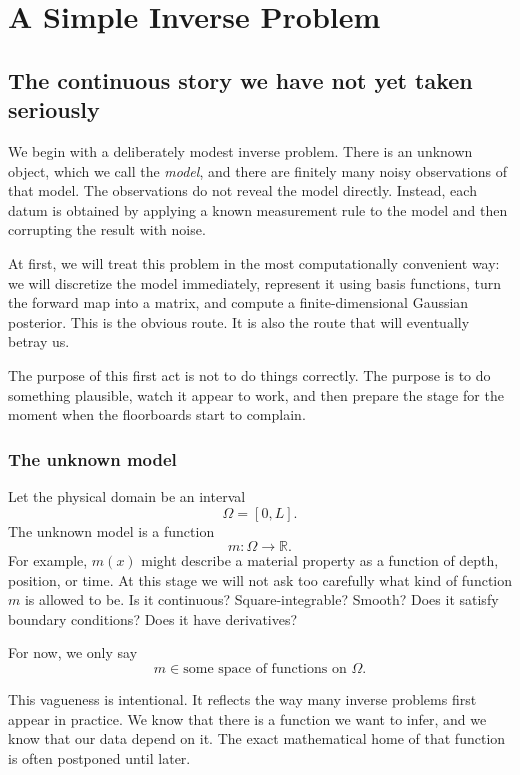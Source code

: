\documentclass[11pt,a4paper]{book}
\begin{document}
\chapter{A Simple Inverse Problem}

\section{The continuous story we have not yet taken seriously}

We begin with a deliberately modest inverse problem. There is an unknown object,
which we call the \emph{model}, and there are finitely many noisy observations
of that model. The observations do not reveal the model directly. Instead, each
datum is obtained by applying a known measurement rule to the model and then
corrupting the result with noise.

At first, we will treat this problem in the most computationally convenient way:
we will discretize the model immediately, represent it using basis functions,
turn the forward map into a matrix, and compute a finite-dimensional Gaussian
posterior. This is the obvious route. It is also the route that will eventually
betray us.

The purpose of this first act is not to do things correctly. The purpose is to
do something plausible, watch it appear to work, and then prepare the stage for
the moment when the floorboards start to complain.

\subsection{The unknown model}

Let the physical domain be an interval
\[
    \Omega = [0,L].
\]
The unknown model is a function
\[
    m : \Omega \to \mathbb{R}.
\]
For example, $m(x)$ might describe a material property as a function of depth,
position, or time. At this stage we will not ask too carefully what kind of
function $m$ is allowed to be. Is it continuous? Square-integrable? Smooth?
Does it satisfy boundary conditions? Does it have derivatives?

For now, we only say
\[
    m \in \text{some space of functions on } \Omega.
\]

This vagueness is intentional. It reflects the way many inverse problems first
appear in practice. We know that there is a function we want to infer, and we
know that our data depend on it. The exact mathematical home of that function is
often postponed until later.
\end{document}
